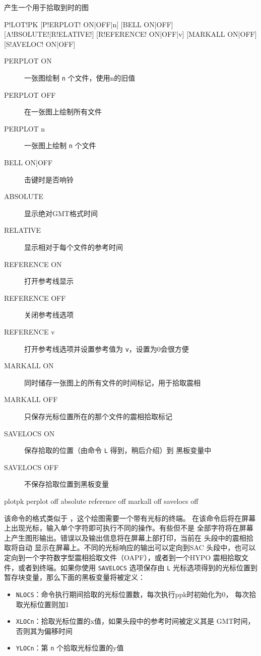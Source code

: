 \label{cmd:plotpk}

产生一个用于拾取到时的图

\begin{SACSTX}
P!LOT!PK [P!ERPLOT! ON|OFF|n] [BELL ON|OFF] [A!BSOLUTE!|R!ELATIVE!]
    [R!EFERENCE! ON|OFF|v] [MARKALL ON|OFF] [S!AVELOC! ON|OFF]
\end{SACSTX}

\begin{description}
\item [PERPLOT ON] 一张图绘制 \texttt{n} 个文件，使用n的旧值
\item [PERPLOT OFF] 在一张图上绘制所有文件
\item [PERPLOT n] 一张图上绘制 \texttt{n} 个文件
\item [BELL ON|OFF]  击键时是否响铃
\item [ABSOLUTE] 显示绝对GMT格式时间
\item [RELATIVE] 显示相对于每个文件的参考时间
\item [REFERENCE ON] 打开参考线显示
\item [REFERENCE OFF] 关闭参考线选项
\item [REFERENCE v] 打开参考线选项并设置参考值为 \texttt{v}，设置为0会很方便
\item [MARKALL ON] 同时储存一张图上的所有文件的时间标记，用于拾取震相
\item [MARKALL OFF] 只保存光标位置所在的那个文件的震相拾取标记
\item [SAVELOCS ON]  保存拾取的位置（由命令 \texttt{L} 得到，稍后介绍）到
    黑板变量中
\item [SAVELOCS OFF]  不保存拾取位置到黑板变量
\end{description}

\begin{SACDFT}
plotpk perplot off absolute reference off markall off savelocs off
\end{SACDFT}

该命令的格式类似于 ，这个绘图需要一个带有光标的终端。
在该命令后将在屏幕上出现光标，输入单个字符即可执行不同的操作。有些但不是
全部字符将在屏幕上产生图形输出。错误以及输出信息将在屏幕上部打印，当前在
头段中的震相拾取将自动	显示在屏幕上。不同的光标响应的输出可以定向到SAC
头段中，也可以定向到一个字符数字型震相拾取文件（OAPF），或者到一个HYPO
震相拾取文件，或者到终端。如果你使用 \texttt{SAVELOCS} 选项保存由 \texttt{L}
光标选项得到的光标位置到暂存块变量，那么下面的黑板变量将被定义：
\begin{itemize}
\item \texttt{NLOCS}：命令执行期间拾取的光标位置数，每次执行ppk时初始化为0，
    每次拾取光标位置则加1
\item \texttt{XLOCn}：拾取光标位置的x值，如果头段中的参考时间被定义其是
    GMT时间，否则其为偏移时间
\item \texttt{YLOCn}：第 \texttt{n} 个拾取光标位置的y值
\end{itemize}
